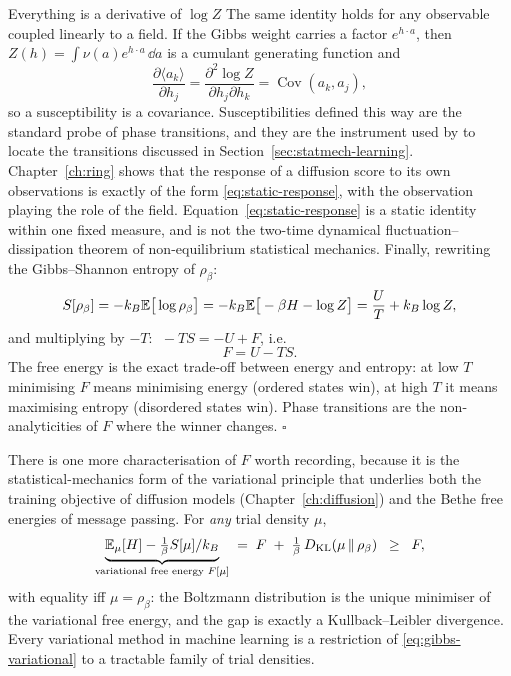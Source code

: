 \begin{toolbox}{Everything is a derivative of $\log Z$}
The same identity holds for any observable coupled linearly to a field. If the
Gibbs weight carries a factor $e^{h \cdot a}$, then
$Z(h) = \int \nu(a) e^{h\cdot a}\,\dd a$ is a cumulant generating function and
\begin{equation}
  \frac{\partial \langle a_k \rangle}{\partial h_j}
  = \frac{\partial^2 \log Z}{\partial h_j \partial h_k}
  = \operatorname{Cov}(a_k, a_j) ,
  \label{eq:static-response}
\end{equation}
so a susceptibility is a covariance. Susceptibilities defined this way are the
standard probe of phase transitions, and they are the instrument used by
\citet{bachtis2024cascade} to locate the transitions discussed in
Section~\ref{sec:statmech-learning}. Chapter~\ref{ch:ring} shows that the
response of a diffusion score to its own observations is exactly of the form
\eqref{eq:static-response}, with the observation playing the role of the field.
Equation~\eqref{eq:static-response} is a static identity within one fixed
measure, and is not the two-time dynamical fluctuation--dissipation theorem of
non-equilibrium statistical mechanics.
Finally, rewriting the Gibbs--Shannon entropy of $\rho_\beta$:
\begin{equation*}
  S[\rho_\beta]
  = -k_B \mathbb{E}\big[\log \rho_\beta\big]
  = -k_B \mathbb{E}\big[-\beta H - \log Z\big]
  = \frac{U}{T} + k_B \log Z ,
\end{equation*}
and multiplying by $-T$: $\; -TS = -U + F$, i.e.
\begin{equation*}
  F = U - TS .
\end{equation*}
The free energy is the exact trade-off between energy and entropy: at low
$T$ minimising $F$ means minimising energy (ordered states win), at high
$T$ it means maximising entropy (disordered states win). Phase
transitions are the non-analyticities of $F$ where the winner changes.
\hfill$\square$
\end{toolbox}

There is one more characterisation of $F$ worth recording, because it is
the statistical-mechanics form of the variational principle that
underlies both the training objective of diffusion models
(Chapter~\ref{ch:diffusion}) and the Bethe free energies of message
passing. For \emph{any} trial density $\mu$,
\begin{equation}
  \underbrace{\mathbb{E}_\mu[H] - \tfrac{1}{\beta} S[\mu]/k_B}_{\text{variational free energy } F[\mu]}
  \;=\; F \;+\; \tfrac{1}{\beta}\, D_{\mathrm{KL}}\!\left(\mu \,\|\, \rho_\beta\right)
  \;\;\geq\;\; F ,
  \label{eq:gibbs-variational}
\end{equation}
with equality iff $\mu = \rho_\beta$: the Boltzmann distribution is the
unique minimiser of the variational free energy, and the gap is exactly a
Kullback--Leibler divergence. Every variational method in machine
learning is a restriction of \eqref{eq:gibbs-variational} to a tractable
family of trial densities.


